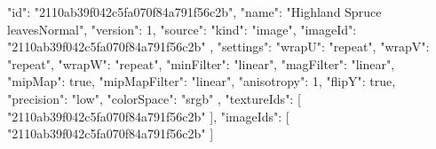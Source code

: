 {
  "id": "2110ab39f042c5fa070f84a791f56c2b",
  "name": "Highland Spruce leavesNormal",
  "version": 1,
  "source": {
    "kind": "image",
    "imageId": "2110ab39f042c5fa070f84a791f56c2b"
  },
  "settings": {
    "wrapU": "repeat",
    "wrapV": "repeat",
    "wrapW": "repeat",
    "minFilter": "linear",
    "magFilter": "linear",
    "mipMap": true,
    "mipMapFilter": "linear",
    "anisotropy": 1,
    "flipY": true,
    "precision": "low",
    "colorSpace": "srgb"
  },
  "textureIds": [
    "2110ab39f042c5fa070f84a791f56c2b"
  ],
  "imageIds": [
    "2110ab39f042c5fa070f84a791f56c2b"
  ]
}
